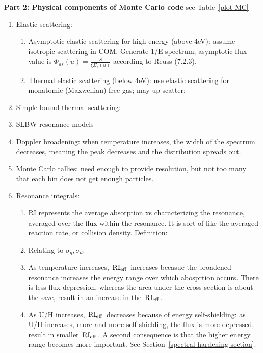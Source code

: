 \documentclass{school-22.211-notes}
\begin{document}
\textbf{Part 2: Physical components of Monte Carlo code} see Table~\ref{plot-MC}
\begin{enumerate}
\item Elastic scattering:
  \begin{enumerate}
  \item Asymptotic elastic scattering for high energy (above 4eV): assume isotropic scattering in COM. Generate 1/E spectrum; asymptotic flux value is $\Phi_{as} (u) = \frac{S}{\xi \Sigma_s (u)}$ according to Reuss (7.2.3). 
  \item Thermal elastic scattering (below 4eV): use elastic scattering for monatomic (Maxwellian) free gas; may up-scatter;
  \end{enumerate}
\item Simple bound thermal scattering: 
\item SLBW resonance models
\item Doppler broadening: when temperature increases, the width of the spectrum decreases, meaning the peak decreases and the distribution spreads out. 
\item Monte Carlo tallies: need enough to provide resolution, but not too many that each bin does not get enough particles. 
\item Resonance integrals: 
  \begin{enumerate}
  \item RI represents the average absorption xs characterizing the resonance, averaged over the flux within the resonance. It is sort of like the averaged reaction rate, or collision density. Definition:
  \item Relating to $\sigma_g, \sigma_d$: 
  \item As temperature increases, $\left. \mathrm{RI}_{\mathrm{eff}} \right.$ increases becasue the broadened resonance increases the energy range over which abosprtion occurs. There is less flux depression, whereas the area under the cross section is about the save, result in an increase in the $\left. \mathrm{RI}_{\mathrm{eff}} \right.$.
  \item As U/H increases, $\left. \mathrm{RI}_{\mathrm{eff}} \right.$ decreases because of energy self-shielding: as U/H increases, more and more self-shielding, the flux is more depressed, result in smaller $\left. \mathrm{RI}_{\mathrm{eff}} \right.$. A second consequence is that the higher energy range becomes more important. See Section~\ref{spectral-hardening-section}. 

\end{enumerate}
\end{enumerate}
\end{document}

